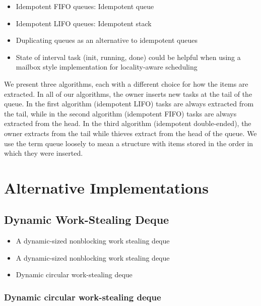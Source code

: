 
\begin{itemize}
\item Idempotent FIFO queues: Idempotent queue
\item Idempotent LIFO queues: Idempotent stack
\item Duplicating queues as an alternative to idempotent queues
\item State of interval task (init, running, done) could be helpful
  when using a mailbox style implementation for locality-aware
  scheduling \cite{Acar2002}
\end{itemize}

We present three algorithms, each with a different choice for how the
items are extracted. In all of our algorithms, the owner inserts new
tasks at the tail of the queue. In the first algorithm (idempotent
LIFO) tasks are always extracted from the tail, while in the second
algorithm (idempotent FIFO) tasks are always extracted from the
head. In the third algorithm (idempotent double-ended), the owner
extracts from the tail while thieves extract from the head of the
queue. We use the term queue loosely to mean a structure with items
stored in the order in which they were inserted.


\section{Alternative Implementations}
\label{sec:queues-alternative-implementations}


\subsection{Dynamic Work-Stealing Deque}

\begin{itemize}
\item A dynamic-sized nonblocking work stealing deque
  \cite{Hendler2006}
\item A dynamic-sized nonblocking work stealing deque
  \cite{Hendler2006a}
\item Dynamic circular work-stealing deque \cite{Chase2005}
\end{itemize}

\subsubsection{Dynamic circular work-stealing deque \cite{Chase2005}}

